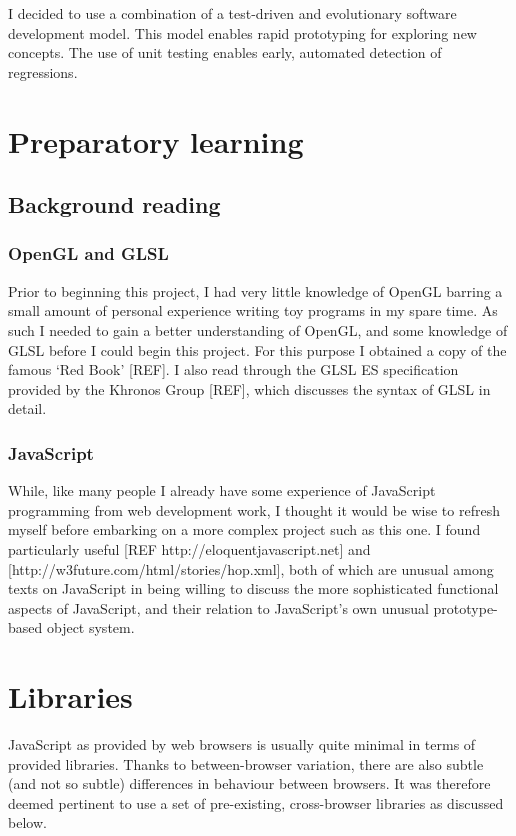 \documentclass[12pt,twoside,notitlepage]{report}
\begin{document}
I decided to use a combination of a test-driven and evolutionary software development model. This model enables rapid prototyping for exploring new concepts. The use of unit testing enables early, automated detection of regressions.

\section{Preparatory learning}
\subsection{Background reading}

\subsubsection{OpenGL and GLSL}
Prior to beginning this project, I had very little knowledge of OpenGL barring a small amount of personal experience writing toy programs in my spare time. As such I needed to gain a better understanding of OpenGL, and some knowledge of GLSL before I could begin this project. For this purpose I obtained a copy of the famous `Red Book' [REF]. I also read through the GLSL ES specification provided by the Khronos Group [REF], which discusses the syntax of GLSL in detail.

\subsubsection{JavaScript}
While, like many people I already have some experience of JavaScript programming from web development work, I thought it would be wise to refresh myself before embarking on a more complex project such as this one. I found particularly useful [REF http://eloquentjavascript.net] and [http://w3future.com/html/stories/hop.xml], both of which are unusual among texts on JavaScript in being willing to discuss the more sophisticated functional aspects of JavaScript, and their relation to JavaScript's own unusual prototype-based object system.


\section{Libraries}
JavaScript as provided by web browsers is usually quite minimal in terms of provided libraries. Thanks to between-browser variation, there are also subtle (and not so subtle) differences in behaviour between browsers. It was therefore deemed pertinent to use a set of pre-existing, cross-browser libraries as discussed below. 
\end{document}

